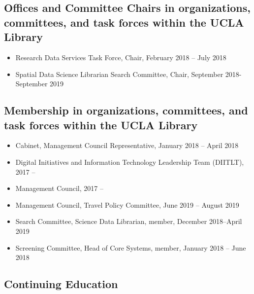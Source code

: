 
\subsection{Offices and Committee Chairs in organizations, committees, and task forces within the UCLA Library}

\begin{itemize}[label={},leftmargin=!,labelindent=5pt,itemindent=-15pt]
  \item Research Data Services Task Force, Chair, February 2018 – July 2018
  \item Spatial Data Science Librarian Search Committee, Chair, September 2018- September 2019
\end{itemize}


\subsection{Membership in organizations, committees, and task forces within the UCLA Library}

\begin{itemize}[label={},leftmargin=!,labelindent=5pt,itemindent=-15pt]
    \item Cabinet, Management Council Representative, January 2018 -- April 2018
    \item Digital Initiatives and Information Technology Leadership Team (DIITLT), 2017 --
    \item Management Council, 2017 --
    \item Management Council, Travel Policy Committee, June 2019 -- August 2019
    \item Search Committee, Science Data Librarian, member, December 2018--April 2019
    \item Screening Committee, Head of Core Systems, member, January 2018 -- June 2018
\end{itemize}

\subsection{Continuing Education}


